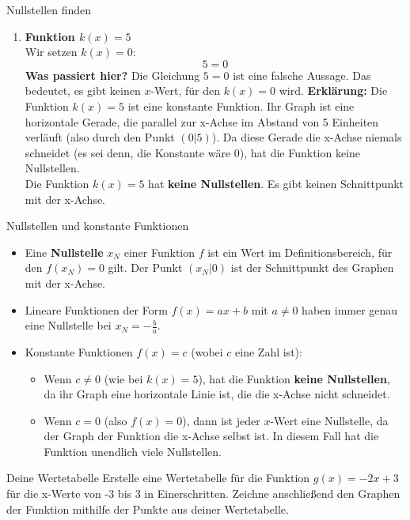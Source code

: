 \begin{loesungsumgebung}{Nullstellen finden}
\begin{enumerate}
    \item \textbf{Funktion $k(x) = 5$} \\
    Wir setzen $k(x)=0$:
    $$ 5 = 0 $$
    \textbf{Was passiert hier?} Die Gleichung $5=0$ ist eine falsche Aussage. Das bedeutet, es gibt keinen $x$-Wert, für den $k(x)=0$ wird.
    \textbf{Erklärung:} Die Funktion $k(x)=5$ ist eine konstante Funktion. Ihr Graph ist eine horizontale Gerade, die parallel zur x-Achse im Abstand von 5 Einheiten verläuft (also durch den Punkt $(0|5)$). Da diese Gerade die x-Achse niemals schneidet (es sei denn, die Konstante wäre 0), hat die Funktion keine Nullstellen. \\
    Die Funktion $k(x)=5$ hat \textbf{keine Nullstellen}. Es gibt keinen Schnittpunkt mit der x-Achse.
\end{enumerate}

\begin{merksatzumgebung}{Nullstellen und konstante Funktionen}
\begin{itemize}
    \item Eine \textbf{Nullstelle} $x_N$ einer Funktion $f$ ist ein Wert im Definitionsbereich, für den $f(x_N)=0$ gilt. Der Punkt $(x_N|0)$ ist der Schnittpunkt des Graphen mit der x-Achse.
    \item Lineare Funktionen der Form $f(x) = ax+b$ mit $a \neq 0$ haben immer genau eine Nullstelle bei $x_N = -\frac{b}{a}$.
    \item Konstante Funktionen $f(x)=c$ (wobei $c$ eine Zahl ist):
    \begin{itemize}
        \item Wenn $c \neq 0$ (wie bei $k(x)=5$), hat die Funktion \textbf{keine Nullstellen}, da ihr Graph eine horizontale Linie ist, die die x-Achse nicht schneidet.
        \item Wenn $c = 0$ (also $f(x)=0$), dann ist jeder $x$-Wert eine Nullstelle, da der Graph der Funktion die x-Achse selbst ist. In diesem Fall hat die Funktion unendlich viele Nullstellen.
    \end{itemize}
\end{itemize}
\end{merksatzumgebung}

\end{loesungsumgebung}


\begin{aufgabenumgebung}{Deine Wertetabelle}
Erstelle eine Wertetabelle für die Funktion $g(x) = -2x + 3$ für die x-Werte von -3 bis 3 in Einerschritten. Zeichne anschließend den Graphen der Funktion mithilfe der Punkte aus deiner Wertetabelle.
\end{aufgabenumgebung}


